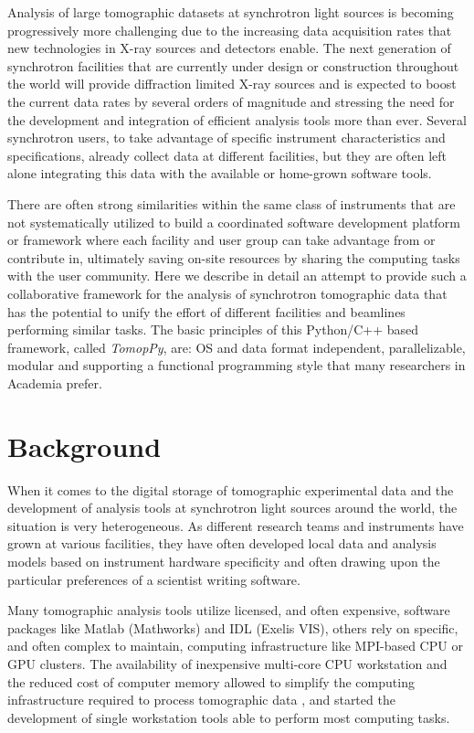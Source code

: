 \documentclass[pdf]{iucr}              %
\begin{document}
Analysis of large tomographic datasets at synchrotron light sources is becoming progressively more challenging  due to the increasing data acquisition rates that new technologies in X-ray sources and detectors enable. The next generation of synchrotron facilities that are currently under design or construction throughout the world will provide diffraction limited X-ray sources and is expected to boost the current data rates by several orders of magnitude and stressing the need for the development and integration of efficient analysis tools more than ever. Several synchrotron users, to take advantage of specific instrument characteristics and specifications,  already collect data at different facilities, but they are often left alone integrating this data with the available or home-grown software tools.

There are often strong similarities within the same class of instruments that are not systematically utilized to build a coordinated software development platform or framework where each facility and user group can take advantage from or contribute in, ultimately saving on-site resources by sharing the computing tasks with the user community. Here we describe in detail an attempt to provide such a collaborative framework for the analysis of synchrotron tomographic data that has the potential to unify the effort of different facilities and beamlines performing similar tasks. The basic principles of this  Python/C++ based framework, called {\it TomopPy}, are: OS and data format independent, parallelizable, modular and supporting a functional programming style that many researchers in Academia prefer. 


\section{Background}

When it comes to the digital storage of tomographic experimental data and the development of analysis tools at synchrotron light sources around the world, the situation is very heterogeneous. As different research teams and instruments have grown at various facilities, they have often developed local data and analysis models based on instrument hardware specificity and often drawing upon the particular preferences of a scientist writing software. 

Many tomographic analysis tools utilize licensed, and often expensive, software packages like Matlab (Mathworks) and IDL (Exelis VIS), others rely on specific, and often complex to maintain, computing infrastructure like MPI-based CPU or GPU clusters. The availability of inexpensive multi-core CPU workstation and the reduced cost of computer memory  allowed to simplify the computing infrastructure required to process tomographic data \cite{rivers_spie_2012}, and started the development of single workstation tools able to perform most computing tasks. 
\end{document}
